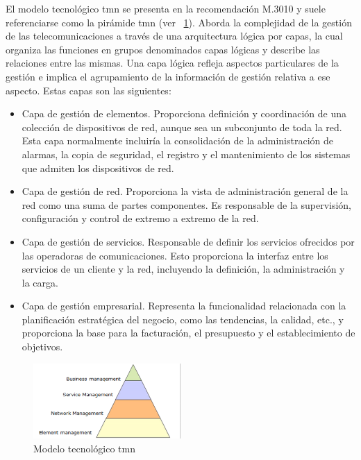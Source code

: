 El modelo tecnológico \acrshort{tmn} se presenta en la recomendación M.3010 y suele referenciarse como la pirámide \acrshort{tmn} (ver \figurename~\ref{fig:pirámide-tmn}). Aborda la complejidad de la gestión de las telecomunicaciones a través de una arquitectura lógica por capas, la cual organiza las funciones en grupos denominados capas lógicas y describe las relaciones entre las mismas. Una capa lógica refleja aspectos particulares de la gestión e implica el agrupamiento de la información de gestión relativa a ese aspecto. Estas capas son las siguientes:
\begin{itemize}
\item Capa de gestión de elementos. Proporciona definición y coordinación de una colección de dispositivos de red, aunque sea un subconjunto de toda la red. Esta capa normalmente incluiría la consolidación de la administración de alarmas, la copia de seguridad, el registro y el mantenimiento de los sistemas que admiten los dispositivos de red.
\item Capa de gestión de red. Proporciona la vista de administración general de la red como una suma de partes componentes. Es responsable de la supervisión, configuración y control de extremo a extremo de la red.
\item Capa de gestión de servicios. Responsable de definir los servicios ofrecidos por las operadoras de comunicaciones. Esto proporciona la interfaz entre los servicios de un cliente y la red, incluyendo la definición, la administración y la carga.
\item Capa de gestión empresarial. Representa la funcionalidad relacionada con la planificación estratégica del negocio, como las tendencias, la calidad, etc., y proporciona la base para la facturación, el presupuesto y el establecimiento de objetivos.
\end{itemize}

\begin{figure}
  \centering
  \includegraphics[width=0.50\textwidth]{imaxes/piramide-tmn.png}
  \caption{Modelo tecnológico \acrshort{tmn}}
  \label{fig:pirámide-tmn}
\end{figure}


